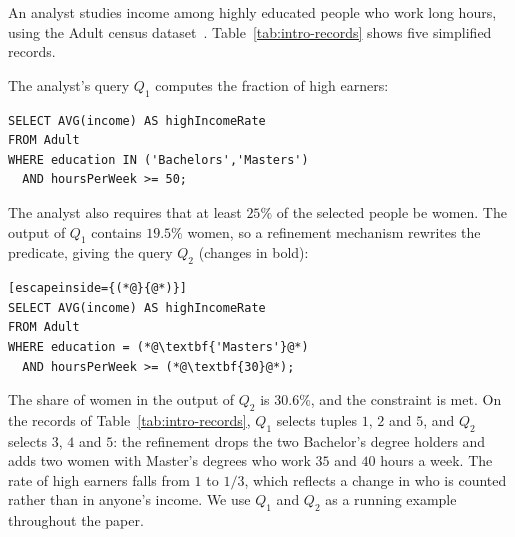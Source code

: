 \begin{example}
\label{ex:intro}
An analyst studies income among highly educated people who work long hours, using the Adult census dataset~\cite{adult-uci}.
Table~\ref{tab:intro-records} shows five simplified records.

\begin{center}
\label{tab:intro-records}
\end{center}

\noindent The analyst's query $Q_1$ computes the fraction of high earners:

\begin{lstlisting}
SELECT AVG(income) AS highIncomeRate
FROM Adult
WHERE education IN ('Bachelors','Masters')
  AND hoursPerWeek >= 50;
\end{lstlisting}

\noindent The analyst also requires that at least $25\%$ of the selected people be women.
The output of $Q_1$ contains $19.5\%$ women, so a refinement mechanism rewrites the predicate, giving the query $Q_2$ (changes in bold):

\begin{lstlisting}[escapeinside={(*@}{@*)}]
SELECT AVG(income) AS highIncomeRate
FROM Adult
WHERE education = (*@\textbf{'Masters'}@*)
  AND hoursPerWeek >= (*@\textbf{30}@*);
\end{lstlisting}

\noindent The share of women in the output of $Q_2$ is $30.6\%$, and the constraint is met.
On the records of Table~\ref{tab:intro-records}, $Q_1$ selects tuples $1$, $2$ and $5$, and $Q_2$ selects $3$, $4$ and $5$: the refinement drops the two Bachelor's degree holders and adds two women with Master's degrees who work $35$ and $40$ hours a week.
The rate of high earners falls from $1$ to $1/3$, which reflects a change in who is counted rather than in anyone's income.
We use $Q_1$ and $Q_2$ as a running example throughout the paper.
\end{example}

